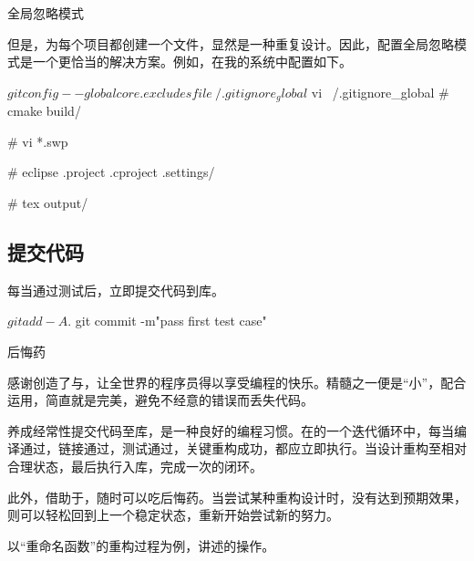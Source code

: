 \begin{content}
\begin{episode}{全局忽略模式}
\begin{content}
但是，为每个项目都创建一个文件，显然是一种重复设计。因此，配置全局忽略模式是一个更恰当的解决方案。例如，在我的系统中配置如下。

 \begin{c++}[caption={\ttfamily{Git：配置全局忽略模式}}]
$ git config --global core.excludesfile ~/.gitignore_global
$ vi ~/.gitignore_global
# cmake
build/

# vi
*.swp

# eclipse
.project
.cproject
.settings/

# tex
output/
 \end{c++}

\end{content}
\end{episode}

\subsection{提交代码}

每当通过测试后，立即提交代码到库。

\begin{leftbar}
 \begin{c++}[caption={\ttfamily{提交代码}}]
$ git add -A .
$ git commit -m"pass first test case"
 \end{c++}
\end{leftbar}

\begin{episode}{后悔药}

\begin{content}

感谢创造了与，让全世界的程序员得以享受编程的快乐。精髓之一便是“小”，配合运用，简直就是完美，避免不经意的错误而丢失代码。

养成经常性提交代码至库，是一种良好的编程习惯。在的一个迭代循环中，每当编译通过，链接通过，测试通过，关键重构成功，都应立即执行。当设计重构至相对合理状态，最后执行入库，完成一次的闭环。

此外，借助于，随时可以吃后悔药。当尝试某种重构设计时，没有达到预期效果，则可以轻松回到上一个稳定状态，重新开始尝试新的努力。

以“重命名函数”的重构过程为例，讲述的操作。

\begin{enum}
\end{enum}

\end{content}
\end{episode}

\end{content}

